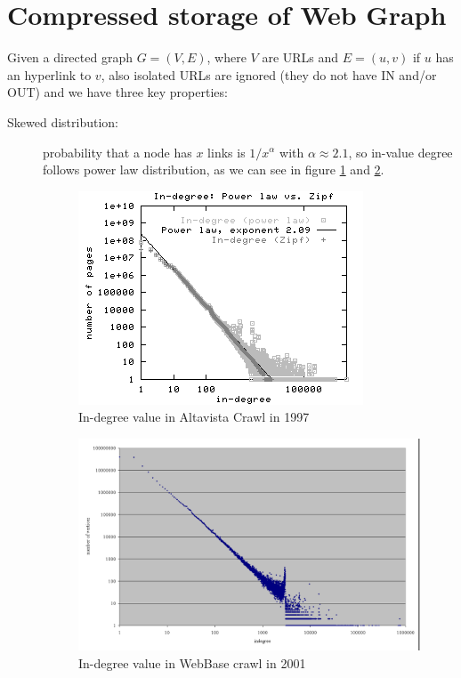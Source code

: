 \section{Compressed storage of Web Graph}
    Given a directed graph $G = (V, E)$, where $V$ are URLs and $E = (u, v)$ if $u$ has an hyperlink to $v$, also isolated URLs are ignored (they do not have IN and/or OUT)
    and we have three key properties:
    \begin{description}
	    \item [Skewed distribution: ] probability that a node has $x$ links is $1/x^{\alpha}$ with $\alpha \approx 2.1$, so in-value degree follows power law distribution, 
		    			  as we can see in figure \ref{img:altavistaCrawl} and \ref{img:webbaseCrawl}.

					  \begin{figure}
						  \caption{In-degree value in Altavista Crawl in 1997}
						  \label{img:altavistaCrawl}
						  \includegraphics[width=\textwidth]{Images/altavistaCrawl}
					  \end{figure}

					  \begin{figure}
						  \caption{In-degree value in WebBase crawl in 2001}
						  \label{img:webbaseCrawl}
						  \includegraphics[width=\textwidth]{Images/webBaseCrawl}
					  \end{figure}
						  

\end{description}
